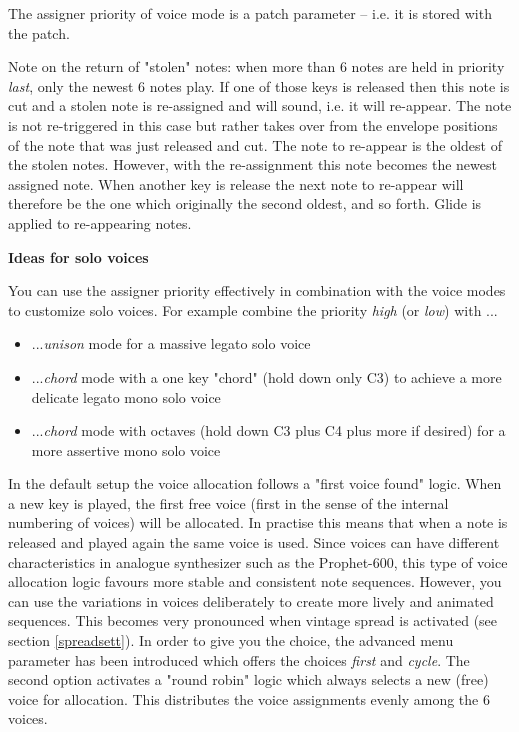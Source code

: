 The assigner priority of voice mode is a patch parameter -- i.e. it is stored with the patch. 

Note on the return of "stolen" notes: when more than 6 notes are held in priority \textit{last}, only the newest 6 notes play. If one of those keys is released then this note is cut and a stolen note is re-assigned and will sound, i.e. it will re-appear. The note is not re-triggered in this case but rather takes over from the envelope positions of the note that was just released and cut. The note to re-appear is the oldest of the stolen notes. However, with the re-assignment this note becomes the newest assigned note. When another key is release the next note to re-appear will therefore be the one which originally the second oldest, and so forth. Glide is applied to re-appearing notes.

\textbf{Ideas for solo voices}

You can use the assigner priority effectively in combination with the voice modes to customize solo voices. For example combine the priority \textit{high} (or \textit{low}) with ...
\begin{itemize}
  \item ...\textit{unison} mode for a massive legato solo voice
  \item ...\textit{chord} mode with a one key "chord" (hold down only C3) to achieve a more delicate legato mono solo voice
  \item ...\textit{chord} mode with octaves (hold down C3 plus C4 plus more if desired) for a more assertive mono solo voice   
\end{itemize}

In the default setup the voice allocation follows a "first voice found" logic. When a new key is played, the first free voice (first in the sense of the internal numbering of voices) will be allocated. In practise this means that when a note is released and played again the same voice is used. Since voices can have different characteristics in analogue synthesizer such as the Prophet-600, this type of voice allocation logic favours more stable and consistent note sequences. However, you can use the variations in voices deliberately to create more lively and animated sequences. This becomes very pronounced when vintage spread is activated (see section \ref{spreadsett}). In order to give you the choice, the advanced menu parameter \assign has been introduced which offers the choices \textit{first} and \textit{cycle}. The second option activates a "round robin" logic which always selects a new (free) voice for allocation. This distributes the voice assignments evenly among the 6 voices.   

